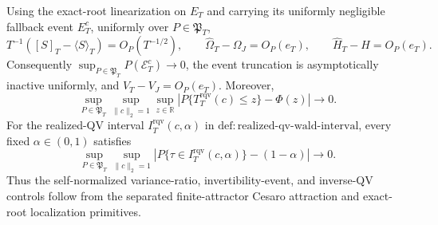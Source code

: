 Using the exact-root linearization on \(E_T\) and carrying its uniformly negligible fallback event \(E_T^c\), uniformly over \(P\in\mathfrak P_T\),
\[
 T^{-1}([S]_T-\langle S\rangle_T)=O_P(T^{-1/2}),\qquad
 \widehat\Omega_T-\Omega_J=O_P(e_T),\qquad
 \widehat H_T-H=O_P(e_T).
\]
Consequently \(\sup_{P\in\mathfrak P_T}P(\mathcal E_T^c)\to0\), the event truncation is asymptotically inactive uniformly, and \(\widehat V_T-V_J=O_P(e_T)\). Moreover,
\[
 \sup_{P\in\mathfrak P_T}\sup_{\|c\|_2=1}\sup_{z\in\mathbb R}
 \left|P\{T_T^{\mathrm{rqv}}(c)\le z\}-\Phi(z)\right|\longrightarrow0.
\]
For the realized-QV interval \(I_T^{\mathrm{rqv}}(c,\alpha)\) in \(\mathrm{def:realized\text{-}qv\text{-}wald\text{-}interval}\), every fixed \(\alpha\in(0,1)\) satisfies
\[
 \sup_{P\in\mathfrak P_T}\sup_{\|c\|_2=1}
 \left|P\{\tau\in I_T^{\mathrm{rqv}}(c,\alpha)\}-(1-\alpha)\right|
 \longrightarrow0.
\]
Thus the self-normalized variance-ratio, invertibility-event, and inverse-QV controls follow from the separated finite-attractor Cesaro attraction and exact-root localization primitives.